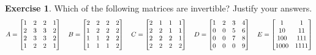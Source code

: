 \documentclass[a4paper]{amsart}
\theoremstyle{definition}
\newtheorem{exercise}{Exercise}
\begin{document}
\begin{exercise}\label{ex-invertible-i}
 Which of the following matrices are invertible?  Justify your
 answers. 
 \[ A = \left[\begin{matrix} 1&2&2&1 \\ 2&3&3&2 \\ 2&3&3&2 \\ 1&2&2&1 \end{matrix}\right]
    \quad
    B = \left[\begin{matrix} 2&2&2&2 \\ 1&2&2&2 \\ 1&1&2&2 \\ 1&1&1&2 \end{matrix}\right]
    \quad
    C = \left[\begin{matrix} 2&1&1&1 \\ 2&2&1&1 \\ 2&2&2&1 \\ 2&2&2&2 \end{matrix}\right]
    \quad
    D = \left[\begin{matrix} 1&2&3&4 \\ 0&0&5&6 \\ 0&0&7&8 \\ 0&0&0&9 \end{matrix}\right]
    \quad
    E = \left[\begin{matrix} 1 & 1 \\ 10 & 11 \\ 100 & 111 \\ 1000 & 1111 \end{matrix}\right]
 \]
\end{exercise}
\end{document}
